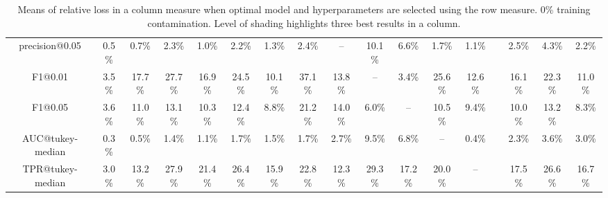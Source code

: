\begin{table*}
{\begin{tabular}[h]{c c c c c c c c c c c c c c c c c }
  precision@0.05 & 0.5\% & 0.7\% & 2.3\% & 1.0\% & 2.2\% & 1.3\% & 2.4\% & -- & 10.1\% & 6.6\% & 1.7\% & 1.1\% &  & 2.5\% & 4.3\% & \cellcolor{gray!30}2.2\%  \\ 
  F1@0.01 & 3.5\% & 17.7\% & 27.7\% & 16.9\% & 24.5\% & 10.1\% & 37.1\% & 13.8\% & -- & \cellcolor{gray!45}3.4\% & 25.6\% & 12.6\% &  & 16.1\% & 22.3\% & 11.0\%  \\ 
  F1@0.05 & 3.6\% & 11.0\% & 13.1\% & 10.3\% & 12.4\% & 8.8\% & 21.2\% & 14.0\% & \cellcolor{gray!45}6.0\% & -- & 10.5\% & 9.4\% &  & 10.0\% & 13.2\% & 8.3\%  \\ 
  AUC@tukey-median & \cellcolor{gray!15}0.3\% & \cellcolor{gray!15}0.5\% & 1.4\% & 1.1\% & 1.7\% & 1.5\% & \cellcolor{gray!15}1.7\% & 2.7\% & 9.5\% & 6.8\% & -- & \cellcolor{gray!45}0.4\% &  & 2.3\% & 3.6\% & 3.0\%  \\ 
  TPR@tukey-median & 3.0\% & 13.2\% & 27.9\% & 21.4\% & 26.4\% & 15.9\% & 22.8\% & 12.3\% & 29.3\% & 17.2\% & 20.0\% & -- &  & 17.5\% & 26.6\% & 16.7\%  \\ 
 \end{tabular}
 }
 \caption{Means of relative loss in a column measure when optimal model and hyperparameters are selected using the row measure. 0\%  training contamination. Level of shading highlights three best results in a column.} 
 \label{tab:measure_comparison_full_0_by_models_tukey_median} 
\end{table*}